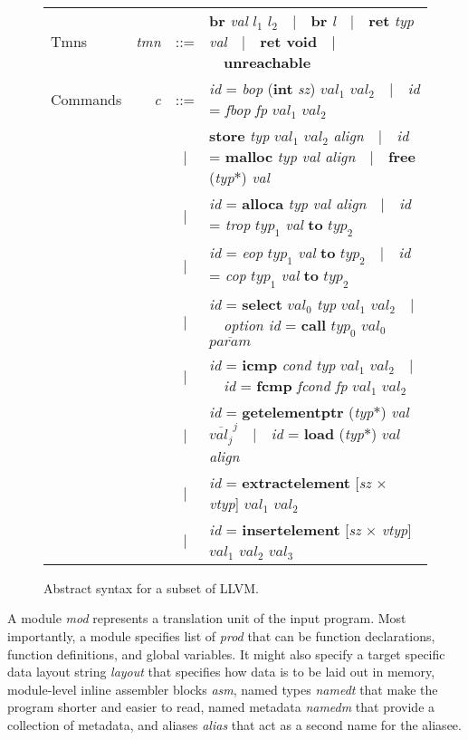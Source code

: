 \documentclass[a4paper]{book}
\begin{document}
\begin{figure}[hb]
\begin{tabular}{ l r c l }
Tmns & \textit{tmn} & ::= & \textbf{br} \textit{val} $\textit{l}_1$ $\textit{l}_2$~~|~~\textbf{br} \textit{l}~~|~~\textbf{ret} \textit{typ val}~~|~~\textbf{ret void}~~|~~\textbf{unreachable} \\

Commands & \textit{c} & ::= & \textit{id} = \textit{bop} (\textbf{int} \textit{sz}) $\textit{val}_1$ $\textit{val}_2$~~|~~\textit{id} = \textit{fbop} \textit{fp} $\textit{val}_1$ $\textit{val}_2$ \\
& & | & \textbf{store} \textit{typ} $\textit{val}_1$ $\textit{val}_2$ \textit{align}~~|~~\textit{id} = \textbf{malloc} \textit{typ val align}~~|~~\textbf{free} (\textit{typ}$*$) \textit{val} \\
& & | & \textit{id} = \textbf{alloca} \textit{typ val align}~~|~~\textit{id} = \textit{trop} $\textit{typ}_1$ \textit{val} \textbf{to} $\textit{typ}_2$ \\
& & | & \textit{id} = \textit{eop} $\textit{typ}_1$ \textit{val} \textbf{to} $\textit{typ}_2$~~|~~\textit{id} = \textit{cop} $\textit{typ}_1$ \textit{val} \textbf{to} $\textit{typ}_2$ \\
& & | & \textit{id} = \textbf{select} $\textit{val}_0$ \textit{typ} $\textit{val}_1$ $\textit{val}_2$~~|~~\textit{option id} = \textbf{call} $\textit{typ}_0$ $\textit{val}_0$ $\overline{\textit{param}}$ \\
& & | & \textit{id} = \textbf{icmp} \textit{cond typ} $\textit{val}_1$ $\textit{val}_2$~~|~~\textit{id} = \textbf{fcmp} \textit{fcond fp} $\textit{val}_1$ $\textit{val}_2$ \\
& & | & \textit{id} = \textbf{getelementptr} (\textit{typ}$*$) \textit{val} $\overline{\textit{val}_j}^j$~~|~~\textit{id} = \textbf{load} (\textit{typ}$*$) $\textit{val}$ \textit{align} \\
& & | & \textit{id} = \textbf{extractelement} [\textit{sz} $\times$ \textit{vtyp}] $\textit{val}_1$ $\textit{val}_2$ \\
& & | & \textit{id} = \textbf{insertelement} [\textit{sz} $\times$ \textit{vtyp}] $\textit{val}_1$ $\textit{val}_2$ $\textit{val}_3$ \\

\end{tabular}
\caption{Abstract syntax for a subset of LLVM.}
\label{fig:llvmsyntax}
\end{figure}

A module \textit{mod} represents a translation unit of the input
program.  Most importantly, a module specifies list of \textit{prod}
that can be function declarations, function definitions, and global
variables.  It might also specify a target specific data layout string
\textit{layout} that specifies how data is to be laid out in memory,
module-level inline assembler blocks \textit{asm}, named types
\textit{namedt} that make the program shorter and easier to read,
named metadata \textit{namedm} that provide a collection of metadata,
and aliases \textit{alias} that act as a second name for the aliasee.
\end{document}
